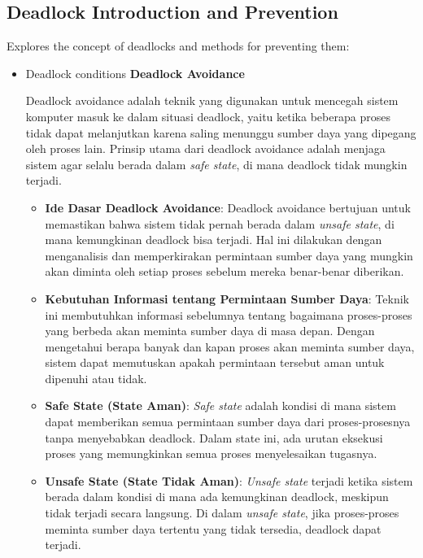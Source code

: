 \documentclass[12pt]{article}
\begin{document}
\subsection{Deadlock Introduction and Prevention}
Explores the concept of deadlocks and methods for preventing them:
\begin{itemize}
    \item Deadlock conditions
    \textbf{Deadlock Avoidance} 

Deadlock avoidance adalah teknik yang digunakan untuk mencegah sistem komputer masuk ke dalam situasi deadlock, yaitu ketika beberapa proses tidak dapat melanjutkan karena saling menunggu sumber daya yang dipegang oleh proses lain. Prinsip utama dari deadlock avoidance adalah menjaga sistem agar selalu berada dalam \textit{safe state}, di mana deadlock tidak mungkin terjadi.
\begin{itemize}
\item \textbf{Ide Dasar Deadlock Avoidance}: Deadlock avoidance bertujuan untuk memastikan bahwa sistem tidak pernah berada dalam \textit{unsafe state}, di mana kemungkinan deadlock bisa terjadi. Hal ini dilakukan dengan menganalisis dan memperkirakan permintaan sumber daya yang mungkin akan diminta oleh setiap proses sebelum mereka benar-benar diberikan.
\item \textbf{Kebutuhan Informasi tentang Permintaan Sumber Daya}: Teknik ini membutuhkan informasi sebelumnya tentang bagaimana proses-proses yang berbeda akan meminta sumber daya di masa depan. Dengan mengetahui berapa banyak dan kapan proses akan meminta sumber daya, sistem dapat memutuskan apakah permintaan tersebut aman untuk dipenuhi atau tidak.
\item \textbf{Safe State (State Aman)}: \textit{Safe state} adalah kondisi di mana sistem dapat memberikan semua permintaan sumber daya dari proses-prosesnya tanpa menyebabkan deadlock. Dalam state ini, ada urutan eksekusi proses yang memungkinkan semua proses menyelesaikan tugasnya.
\item \textbf{Unsafe State (State Tidak Aman)}: \textit{Unsafe state} terjadi ketika sistem berada dalam kondisi di mana ada kemungkinan deadlock, meskipun tidak terjadi secara langsung. Di dalam \textit{unsafe state}, jika proses-proses meminta sumber daya tertentu yang tidak tersedia, deadlock dapat terjadi.


\end{itemize}
\end{itemize}
\end{document}
